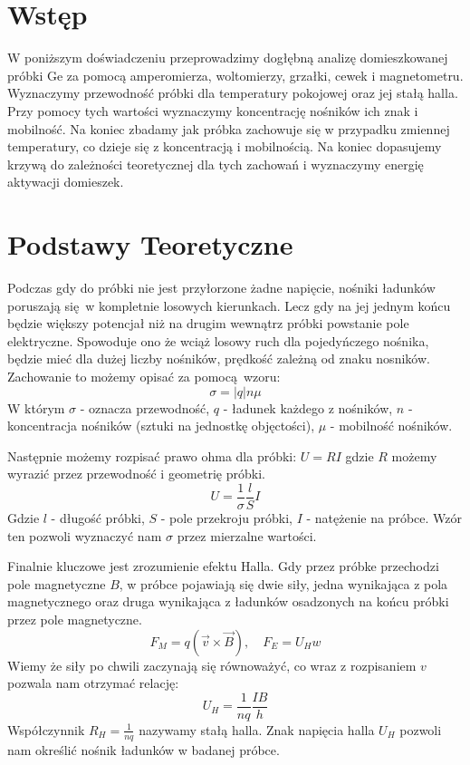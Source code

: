 \documentclass[12pt]{article}
\title{}
\author{Kacper Kłos}
\begin{document}
\maketitle

\newpage
\section{Wstęp}
W poniższym doświadczeniu przeprowadzimy dogłębną analizę domieszkowanej próbki Ge za pomocą amperomierza, woltomierzy, grzałki, cewek i magnetometru. Wyznaczymy przewodność próbki dla temperatury pokojowej
oraz jej stałą halla. Przy pomocy tych wartości wyznaczymy koncentrację nośników ich znak i mobilność. Na koniec zbadamy jak próbka zachowuje się w przypadku zmiennej temperatury, co dzieje się z koncentracją i mobilnością.
Na koniec dopasujemy krzywą do zależności teoretycznej dla tych zachowań i wyznaczymy energię aktywacji domieszek.

\section{Podstawy Teoretyczne}
Podczas gdy do próbki nie jest przyłorzone żadne napięcie, nośniki ładunków poruszają się w kompletnie losowych kierunkach.
Lecz gdy na jej jednym końcu będzie większy potencjał niż na drugim wewnątrz próbki powstanie pole elektryczne.
Spowoduje ono że wciąż losowy ruch dla pojedyńczego nośnika, będzie mieć dla dużej liczby nośników, prędkość zależną od znaku nosników.
Zachowanie to możemy opisać za pomocą wzoru:
\begin{equation}
    \sigma = |q|n\mu
    \label{eq:conductivity}
\end{equation}
W którym $\sigma$ - oznacza przewodność, $q$ - ładunek każdego z nośników, $n$ - koncentracja nośników (sztuki na jednostkę objęctości), $\mu$ - mobilność nośników.

Następnie możemy rozpisać prawo ohma dla próbki: $U=RI$ gdzie $R$ możemy wyrazić przez przewodność i geometrię próbki.
\begin{equation}
    U = \frac{1}{\sigma} \frac{l}{S} I
    \label{eq:ohm_law}
\end{equation}
Gdzie $l$ - długość próbki, $S$ - pole przekroju próbki, $I$ - natężenie na próbce. Wzór ten pozwoli wyznaczyć nam $\sigma$ przez mierzalne wartości.

Finalnie kluczowe jest zrozumienie efektu Halla. Gdy przez próbke przechodzi pole magnetyczne $B$, w próbce pojawiają się dwie siły, 
jedna wynikająca z pola magnetycznego oraz druga wynikająca z ładunków osadzonych na końcu próbki przez pole magnetyczne.
\[
    F_M = q(\vec{v} \times \vec{B}), \quad F_E = U_H w
\]
Wiemy że siły po chwili zaczynają się równoważyć, co wraz z rozpisaniem $v$ pozwala nam otrzymać relację:
\begin{equation}
    U_H = \frac{1}{nq}\frac{IB}{h}
    \label{eq:hall_voltage}
\end{equation}
Współczynnik $R_H = \frac{1}{nq}$ nazywamy stałą halla. Znak napięcia halla $U_H$ pozwoli nam określić nośnik ładunków w badanej próbce.
\end{document}
